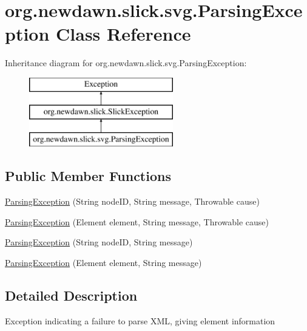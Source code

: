 \hypertarget{classorg_1_1newdawn_1_1slick_1_1svg_1_1_parsing_exception}{}\section{org.\+newdawn.\+slick.\+svg.\+Parsing\+Exception Class Reference}
\label{classorg_1_1newdawn_1_1slick_1_1svg_1_1_parsing_exception}
Inheritance diagram for org.\+newdawn.\+slick.\+svg.\+Parsing\+Exception\+:\begin{figure}[H]
\begin{center}
\leavevmode
\includegraphics[height=3.000000cm]{classorg_1_1newdawn_1_1slick_1_1svg_1_1_parsing_exception}
\end{center}
\end{figure}
\subsection*{Public Member Functions}
\begin{DoxyCompactItemize}
\item 
\mbox{\hyperlink{classorg_1_1newdawn_1_1slick_1_1svg_1_1_parsing_exception_af9b0d519f8b6e99f865956016b8938f9}{Parsing\+Exception}} (String node\+ID, String message, Throwable cause)
\item 
\mbox{\hyperlink{classorg_1_1newdawn_1_1slick_1_1svg_1_1_parsing_exception_a73e8c0f414a6c327904d641ffbaa7741}{Parsing\+Exception}} (Element element, String message, Throwable cause)
\item 
\mbox{\hyperlink{classorg_1_1newdawn_1_1slick_1_1svg_1_1_parsing_exception_ae002947662790b8b48ca8b8f5116948e}{Parsing\+Exception}} (String node\+ID, String message)
\item 
\mbox{\hyperlink{classorg_1_1newdawn_1_1slick_1_1svg_1_1_parsing_exception_ad4eb7a21ccceb0510a682da92e717aa9}{Parsing\+Exception}} (Element element, String message)
\end{DoxyCompactItemize}


\subsection{Detailed Description}
Exception indicating a failure to parse X\+ML, giving element information

